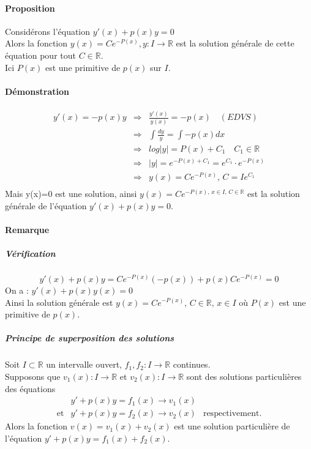 \message{ !name(analyse-02.tex)}\documentclass[1Opt]{report}
\begin{document}
\paragraph{Proposition}
Considérons l'équation $y'(x)+p(x)y=0$ \\
Alors la fonction $y(x)=Ce^{-P(x)}, y:I\rightarrow{\mathbb R}$ est la solution
générale de cette équation pour tout $C\in{\mathbb R}$. \\
Ici $P(x)$ est une primitive de $p(x)$ sur $I$.

\paragraph{Démonstration}
\begin{eqnarray*}
  y'(x)=-p(x)y & \Rightarrow & \frac{y'(x)}{y(x)}=-p(x) \quad (EDVS) \\
  & \Rightarrow & \int{\frac{dy}{y}}=\int{-p(x)dx} \\
  & \Rightarrow & log|y|=P(x)+C_1 \quad C_1\in{\mathbb R} \\
  & \Rightarrow & |y|=e^{-P(x)+C_1}=e^{C_1}\cdot e^{-P(x)} \\
  & \Rightarrow & y(x)=Ce^{-P(x)},\,C=Ie^{C_1} \\
\end{eqnarray*}
Mais y(x)=0 est une solution, ainsi $y(x)=Ce^{-P(x),\,x\in I,\, C\in{\mathbb R}}$
est la solution générale de l'équation $y'(x)+p(x)y=0$.

\paragraph{Remarque}

\subparagraph{Vérification}
\[ y'(x)+p(x)y=Ce^{-P(x)}(-p(x))+p(x)Ce^{-P(x)}=0 \]
On a : $y'(x)+p(x)y(x)=0$ \\
Ainsi la solution générale est $y(x)=Ce^{-P(x)},\,C\in{\mathbb R},\,x\in I$ où
$P(x)$ est une primitive de $p(x)$.

\subparagraph{Principe de superposition des solutions}
Soit $I\subset{\mathbb R}$ un intervalle ouvert, $f_1,f_2:I\rightarrow{\mathbb R}$
continues. \\
Supposons que $v_1(x):I\rightarrow{\mathbb R}$ et $v_2(x):I\rightarrow{\mathbb R}$
sont des solutions particulières des équations
\begin{eqnarray*}
  & y'+p(x)y=f_1(x)\rightarrow v_1(x) &\\
  \mbox{et} & y'+p(x)y=f_2(x)\rightarrow v_2(x) & \mbox{respectivement.}
\end{eqnarray*}
Alors la fonction $v(x)=v_1(x)+v_2(x)$ est une solution particulière de
l'équation $y'+p(x)y=f_1(x)+f_2(x)$.
\end{document}
